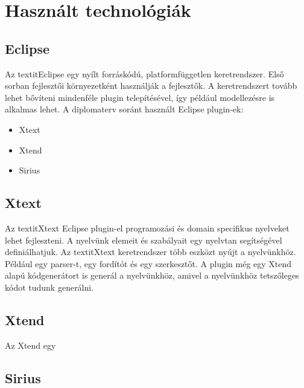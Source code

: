 \clearpage\section{Használt technológiák}
\subsection{Eclipse}

Az textit{Eclipse} egy nyílt forráskódú, platformfüggetlen keretrendszer.
Első sorban fejlesztői környezetként használják a fejlesztők.
A keretrendszert tovább lehet bővíteni mindenféle plugin telepítésével, így például modellezésre is alkalmas lehet.
A diplomaterv soránt használt Eclipse plugin-ek:

\begin{itemize}
    \item Xtext
    \item Xtend
    \item Sirius
\end{itemize}

\subsection{Xtext}

Az textit{Xtext} Eclipse plugin-el programozási és domain specifikus nyelveket lehet fejleszteni.
A nyelvünk elemeit és szabályait egy nyelvtan segítségével definiálhatjuk.
Az textit{Xtext} keretrendszer több eszközt nyújt a nyelvünkhöz.
Például egy parser-t, egy fordítót és egy szerkesztőt.
A plugin még egy Xtend alapú kódgenerátort is generál a nyelvünkhöz, amivel a nyelvünkhöz tetszőleges kódot tudunk generálni.

\subsection{Xtend}

Az Xtend egy 

\subsection{Sirius}